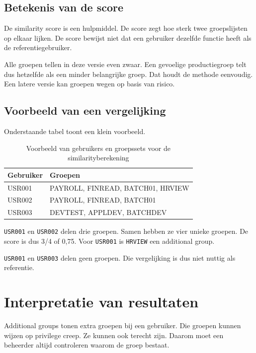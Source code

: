 \subsection*{Betekenis van de score}

De similarity score is een hulpmiddel. De score zegt hoe sterk twee groepslijsten op elkaar lijken. De score bewijst niet dat een gebruiker dezelfde functie heeft als de referentiegebruiker.

Alle groepen tellen in deze versie even zwaar. Een gevoelige productiegroep telt dus hetzelfde als een minder belangrijke groep. Dat houdt de methode eenvoudig. Een latere versie kan groepen wegen op basis van risico.

\subsection*{Voorbeeld van een vergelijking}

Onderstaande tabel toont een klein voorbeeld.

\begin{table}[htbp]
\centering
\caption[Voorbeeld van gebruikers en groepssets]{Voorbeeld van gebruikers en groepssets voor de similarityberekening}
\label{tab:voorbeeld-gebruikers-groepssets}
\begin{tabular}{|p{3cm}|p{9cm}|}
\hline
\textbf{Gebruiker} & \textbf{Groepen} \\
\hline
USR001 & PAYROLL, FINREAD, BATCH01, HRVIEW \\
\hline
USR002 & PAYROLL, FINREAD, BATCH01 \\
\hline
USR003 & DEVTEST, APPLDEV, BATCHDEV \\
\hline
\end{tabular}
\end{table}

\texttt{USR001} en \texttt{USR002} delen drie groepen. Samen hebben ze vier unieke groepen. De score is dus 3/4 of 0,75. Voor \texttt{USR001} is \texttt{HRVIEW} een additional group.

\texttt{USR001} en \texttt{USR003} delen geen groepen. Die vergelijking is dus niet nuttig als referentie.

\section{Interpretatie van resultaten}

Additional groups tonen extra groepen bij een gebruiker. Die groepen kunnen wijzen op privilege creep. Ze kunnen ook terecht zijn. Daarom moet een beheerder altijd controleren waarom de groep bestaat.

